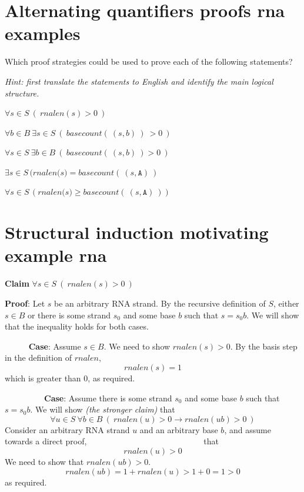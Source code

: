 \documentclass[12pt, oneside]{article}
\newcommand{\A}[0]{\texttt{A}}
\begin{document}
\section*{Alternating quantifiers proofs rna examples}


Which proof strategies could be used to prove each of the following statements?

{\it Hint: first translate the statements to English and identify the main logical structure.}

$\forall s \in S~(~rnalen(s) > 0~)$

\vspace{100pt}

$\forall b \in B~\exists s \in S~(~basecount(~(s,b)~)~ > 0~)$

\vspace{100pt}

$\forall s \in S ~\exists b\in B ~(~basecount(~(s,b)~) > 0~)$

\vspace{100pt}

$\exists s \in S \, (\textit{rnalen(s)} = \textit{basecount}(~(s, \A)~)$

\vspace{100pt}

$\forall s \in S \, (\textit{rnalen(s)} \geq \textit{basecount}(~(s, \A)~))$

\vspace{100pt}

 \vfill
\section*{Structural induction motivating example rna}


{\bf Claim} $\forall s \in S ~(~rnalen(s) > 0~)$

{\bf Proof}: Let $s$ be an arbitrary RNA strand. By the recursive definition of $S$,
either $s \in B$ or there is some strand $s_0$ and some base $b$ such that $s = s_0 b$.
We will show that the inequality holds for both cases.

{$\phantom{Basis}$} {\bf Case}: Assume $s \in B$. We need to show $rnalen(s) > 0$. 
By the basis step in the definition of $rnalen$,
$$rnalen(s) = 1$$
which is greater than $0$, as required.

{$\phantom{Recursive}$} {\bf Case}: Assume there is some strand $s_0$ and some base $b$ 
such that $s = s_0 b$. We will show {\it (the stronger claim)} that 
\[
    \forall u \in S ~\forall b \in B ~( ~\textit{rnalen}(u) >0  \to 
    \textit{rnalen}(ub) >0 ~)
\]
Consider an arbitrary RNA strand $u$ and an arbitrary base $b$, and assume towards a
direct proof,$~~{\phantom{ this is the induction hypothesis}}~~$ that
\[
    rnalen(u) > 0
\]
We need to show that $rnalen(ub) > 0$.
\[
    rnalen(ub) = 1 + rnalen (u) > 1 + 0 = 1 > 0
\]
as required. \vfill
\end{document}

